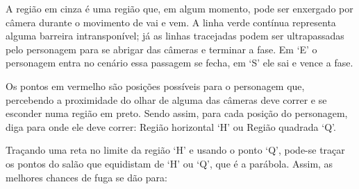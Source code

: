 \documentclass[10 pt,usenames,dvipsnames, oneside]{article}
\begin{document}
A região em cinza é uma região que, em algum momento, pode ser enxergado por câmera durante o movimento de vai e vem. A linha verde contínua representa alguma barreira intransponível; já as linhas tracejadas podem ser ultrapassadas pelo personagem para se abrigar das câmeras e terminar a fase. Em ‘E’ o personagem entra no cenário essa passagem se fecha, em ‘S’ ele sai e vence a fase.

Os pontos em vermelho são posições possíveis para o personagem que, percebendo a proximidade do olhar de alguma das câmeras deve correr e se esconder numa região em preto. Sendo assim, para cada posição do personagem, diga para onde ele deve correr: Região horizontal ‘H’ ou Região quadrada ‘Q’.

\ifdefined\prof
\begin{solucao}

Traçando uma reta no limite da região ‘H’ e usando o ponto ‘Q’, pode-se traçar os pontos do salão que equidistam de ‘H’ ou ‘Q’, que é a parábola. Assim, as melhores chances de fuga se dão para:
\begin{figure}[H]
\centering

\begin{tikzpicture}[every node/.style={scale=2.5}, scale=.9]


\end{tikzpicture}
\end{figure}
\end{solucao}
\end{document}
